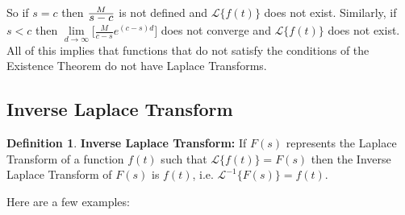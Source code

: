 \documentclass{article}
\theoremstyle{definition}
\newtheorem{definition}{Definition}[section]
\begin{document}
\bigskip
\noindent
So if $s = c$ then $\frac{M}{\mathlarger{s-c}}$ is not defined
and $\mathcal{L}\{f(t)\}$ does not exist. Similarly, if $s < c$
then $\lim\limits_{d \to \infty}\Big [\frac{M}{c-s} e^{(c-s)d}
\Big ]$ does not converge and $\mathcal{L}\{f(t)\}$ does not
exist. All of this implies that functions that do not satisfy the
conditions of the Existence Theorem do not have Laplace
Transforms.



\newpage
\subsection{Inverse Laplace Transform}
\label{sec:inverse_laplace_transform}

\begin{definition} {\bf Inverse Laplace Transform:}
If $F(s)$ represents the Laplace Transform of a function $f(t)$
such that $\mathcal{L}\{f(t)\} = F(s)$ then the Inverse Laplace
Transform of $F(s)$ is $f(t)$, i.e. $\mathcal{L}^{-1}\{F(s)\} =
f(t)$.
\end{definition}

\bigskip
\noindent
Here are a few examples:

\bigskip
\bigskip
\end{document}
